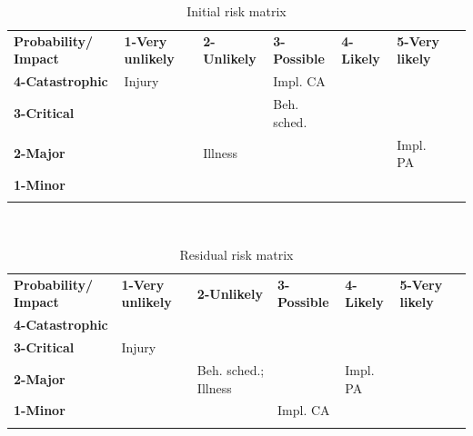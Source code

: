\documentclass[informationsecurity]{gucmasterproject}
\begin{document}
\begin{table}[H]
\centering
\scriptsize
\caption{Initial risk matrix}
\label{tab:initial-risk}
\begin{tabular}{|m{1.75cm}|m{1.75cm}|m{1.75cm}| m{1.75cm} |m{1.75cm}| m{1.75cm}|m{0cm}}
\hhline{|------|} \bf Probability/ Impact & \bf 1-Very unlikely & \bf 2-Unlikely & \bf 3-Possible & \bf 4-Likely & \bf 5-Very likely & \\[10pt]

\hhline{|------|} \bf 4-Catastrophic & \cellcolor{yellow!50} \centering Injury & \cellcolor{red!50}  & \cellcolor{red!50} \centering Impl. CA & \cellcolor{red!50} &\cellcolor{red!50} & \\ [10pt]

\hhline{|------|} \bf 3-Critical &\cellcolor{green!50} & \cellcolor{yellow!50} & \cellcolor{yellow!50} \centering Beh. sched. & \cellcolor{red!50} &\cellcolor{red!50} & \\ [10pt]

\hhline{|------|} \bf 2-Major & \cellcolor{green!50} & \cellcolor{green!50} \centering Illness & \cellcolor{yellow!50} &\cellcolor{yellow!50} &\cellcolor{red!50} \centering Impl. PA & \\[10pt]

\hhline{|------|} \bf 1-Minor & \cellcolor{green!50} & \cellcolor{green!50} & \cellcolor{green!50} &\cellcolor{yellow!50} &\cellcolor{yellow!50} & \\ [10pt]
\hhline{|------|}
\end{tabular} \\
\end{table}

\begin{table}[H]
\centering
\scriptsize
\caption{Residual risk matrix}
\label{tab:residual-risk}
\begin{tabular}{|m{1.75cm}|m{1.75cm}|m{1.75cm}| m{1.75cm} |m{1.75cm}| m{1.75cm}|m{0cm}}
\hhline{|------|} \bf Probability/ Impact & \bf 1-Very unlikely & \bf 2-Unlikely & \bf 3-Possible & \bf 4-Likely & \bf 5-Very likely & \\[10pt]

\hhline{|------|} \bf 4-Catastrophic & \cellcolor{yellow!50} & \cellcolor{red!50} & \cellcolor{red!50} & \cellcolor{red!50} &\cellcolor{red!50} & \\ [10pt]

\hhline{|------|} \bf 3-Critical &\cellcolor{green!50} \centering Injury & \cellcolor{yellow!50} & \cellcolor{yellow!50} & \cellcolor{red!50} &\cellcolor{red!50} & \\ [10pt]

\hhline{|------|} \bf 2-Major & \cellcolor{green!50} & \cellcolor{green!50} \centering Beh. sched.; Illness & \cellcolor{yellow!50} &\cellcolor{yellow!50} \centering Impl. PA &\cellcolor{red!50} & \\[10pt]

\hhline{|------|} \bf 1-Minor & \cellcolor{green!50} & \cellcolor{green!50} & \cellcolor{green!50} \centering Impl. CA &\cellcolor{yellow!50} &\cellcolor{yellow!50} & \\ [10pt]
\hhline{|------|}
\end{tabular} \\
\end{table}
\end{document}
